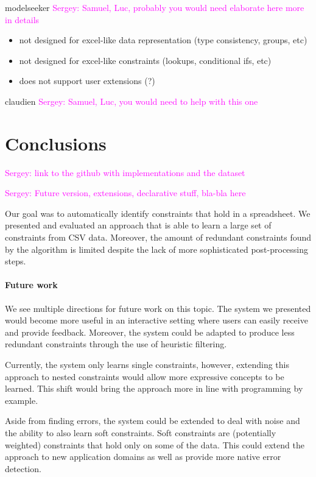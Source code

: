 \documentclass{sig-alternate-05-2015}
\newcommand{\sergey}[1]{\textcolor{magenta}{{\sc Sergey:} #1}\xspace}
\begin{document}
modelseeker \cite{modelseeker} \sergey{Samuel, Luc, probably you would need elaborate here more in details}

\begin{itemize}
  \item not designed for excel-like data representation (type consistency, groups, etc)
  \item not designed for excel-like constraints (lookups, conditional ifs, etc)
  \item does not support user extensions (?)
\end{itemize}

claudien \cite{claudien} \sergey{Samuel, Luc, you would need to help with this one}

\section{Conclusions}
\sergey{link to the github with implementations and the dataset}


\sergey{Future version, extensions, declarative stuff, bla-bla here}

Our goal was to automatically identify constraints that hold in a spreadsheet.
We presented and evaluated an approach that is able to learn a large set of constraints from CSV data.
Moreover, the amount of redundant constraints found by the algorithm is limited despite the lack of more sophisticated post-processing steps.

\paragraph{Future work}
We see multiple directions for future work on this topic.
The system we presented would become more useful in an interactive setting where users can easily receive and provide feedback.
Moreover, the system could be adapted to produce less redundant constraints through the use of heuristic filtering.

Currently, the system only learns single constraints, however, extending this approach to nested constraints would allow more expressive concepts to be learned.
This shift would bring the approach more in line with programming by example.

Aside from finding errors, the system could be extended to deal with noise and the ability to also learn soft constraints.
Soft constraints are (potentially weighted) constraints that hold only on some of the data.
This could extend the approach to new application domains as well as provide more native error detection.



\end{document}
